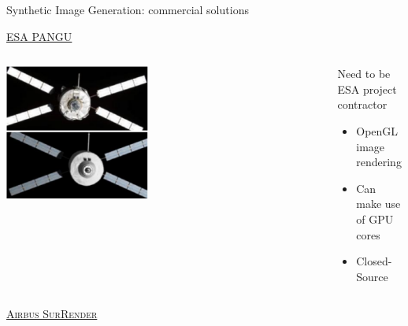 \documentclass[10pt]{beamer}
\begin{document}
\begin{frame}{Synthetic Image Generation: commercial solutions}

  \bigskip

  \begin{overlayarea}{\textwidth}{0.8\textheight}

  \hspace{0.6cm}  
  \textsc{\ul{ESA PANGU}}

  \begin{columns}[T,onlytextwidth]
    \hspace{0.6cm}
    \begin{column}{0.5\textwidth}
    \includegraphics[width=0.45\textwidth]{gfx/pangu3.eps}
    \end{column}
    \hspace{-1.5cm}
    \begin{column}{0.5\textwidth}

    \smallskip
    
    Need to be ESA project contractor    

    \smallskip
    
    \begin{itemize}[label=$\bullet$]
      \item OpenGL image rendering
      \item Can make use of GPU cores
      \item Closed-Source
    \end{itemize}
    \end{column}
  \end{columns}

  \smallskip

  \hspace{0.6cm}  
  \textsc{\ul{Airbus SurRender}}


\end{overlayarea}
\end{frame}
\end{document}
